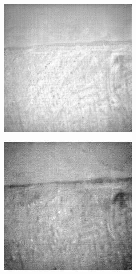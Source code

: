 \documentclass[10pt,twocolumn,letterpaper]{article}
\begin{document}
\begin{figure}[!ht]
\begin{subfigure}[b]{0.19\textwidth}
  \end{subfigure}
  \hfill
  \begin{subfigure}[b]{0.19\textwidth}
      \centering
      \includegraphics[width=\textwidth]{../figs/outputs/cut/13.png}
  \end{subfigure}
  \hfill
  \begin{subfigure}[b]{0.19\textwidth}
      \centering
      \includegraphics[width=\textwidth]{../figs/outputs/petit/13.png}

\end{subfigure}
\end{figure}
\end{document}
